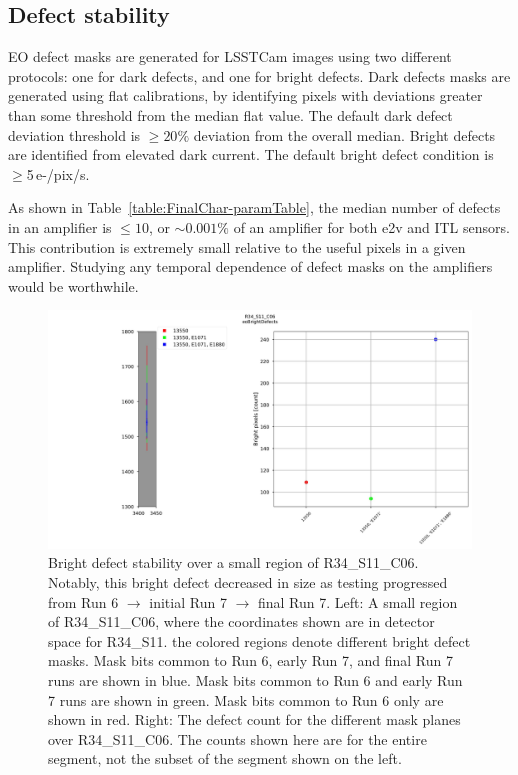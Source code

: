 \subsection{Defect stability}\label{defect-stability}

EO defect masks are generated for LSSTCam images using two different protocols: one for dark defects, and one for bright defects. Dark defects masks are generated using flat calibrations, by identifying pixels with deviations greater than some threshold from the median flat value. The default dark defect deviation threshold is $\geq 20\%$ deviation from the overall median. Bright defects are identified from elevated dark current. The default bright defect condition is $\geq$5\,e-/pix/s.

As shown in Table~\ref{table:FinalChar-paramTable}, the median number of defects in an amplifier is $\leq 10$, or $\sim0.001\%$ of an amplifier for both e2v and ITL sensors. This contribution is extremely small relative to the useful pixels in a given amplifier. Studying any temporal dependence of defect masks on the amplifiers would be worthwhile.  %

\begin{figure}[ht]
    \centering
    \includegraphics[width=\linewidth]{figures/R34_S11_C06(1).jpg}
    \caption{Bright defect stability over a small region of R34\_S11\_C06. Notably, this bright defect decreased in size as testing progressed from Run 6 $\rightarrow$ initial Run 7 $\rightarrow$ final Run 7. Left: A small region of R34\_S11\_C06, where the coordinates shown are in detector space for R34\_S11. the colored regions denote different bright defect masks. Mask bits common to Run 6, early Run 7, and final Run 7 runs are shown in blue. Mask bits common to Run 6 and early Run 7 runs are shown in green. Mask bits common to Run 6 only are shown in red. Right: The defect count for the different mask planes over R34\_S11\_C06. The counts shown here are for the entire segment, not the subset of the segment shown on the left.}
    \label{fig:BrightDefectStability}
\end{figure}

